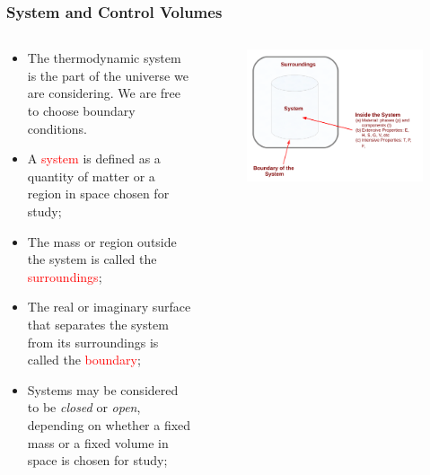 \documentclass[10pt,compress,handout,ignorenonframetext]{beamer}
\begin{document}
\scriptsize
\begin{frame}
 \frametitle{System and Control Volumes}
  \begin{columns}
    \begin{column}[l]{0.55\linewidth}
      \begin{itemize}%
       \item <2-> The thermodynamic system is the part of the universe we are considering. We are free to choose boundary conditions.
       \item <3-> A \textcolor{red}{system} is defined as a quantity of matter or a region in space chosen for study;
       \item <4-> The mass or region outside the system is called the \textcolor{red}{surroundings};
       \item <5-> The real or imaginary surface that separates the system from its surroundings is called the \textcolor{red}{boundary};
       \item <6-> Systems may be considered to be {\it closed} or {\it open}, depending on whether a fixed mass or a fixed volume in space is chosen for study; 
      \end{itemize}
    \end{column}
    \begin{column}[l]{0.45\linewidth}\scriptsize
      \begin{figure}%
        \begin{center}
          \includegraphics[width=1.05\columnwidth,clip]{./Pics/Fig_SystemDefinition}
        \end{center}
      \end{figure}

\end{column}
\end{columns}
\end{frame}
\end{document}
